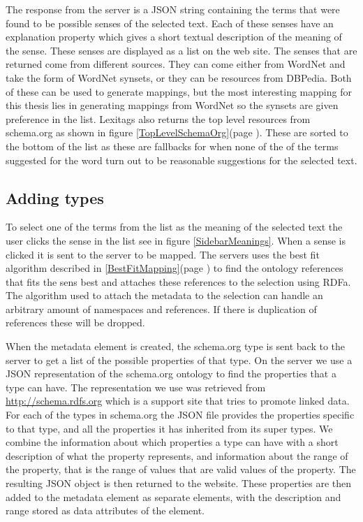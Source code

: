 The response from the server is a JSON string containing the terms that were found to be possible senses of the selected text.
Each of these senses have an explanation property which gives a short textual description of the meaning of the sense.
These senses are displayed as a list on the web site.
The senses that are returned come from different sources.
They can come either from WordNet and take the form of WordNet synsets, or they can be resources from DBPedia.
Both of these can be used to generate mappings,
but the most interesting mapping for this thesis lies in generating mappings from WordNet so the synsets are given preference in the list.
Lexitags also returns the top level resources from schema.org as shown in figure \ref{TopLevelSchemaOrg}(page \pageref{TopLevelSchemaOrg}).
These are sorted to the bottom of the list as these are fallbacks for when none of the of the terms suggested for
the word turn out to be reasonable suggestions for the selected text.

\subsection{Adding types}

To select one of the terms from the list as the meaning of the selected text the user clicks the sense in the list see in
figure \ref{SidebarMeanings}.
When a sense is clicked it is sent to the server to be mapped.
The servers uses the best fit algorithm described in \ref{BestFitMapping}(page \pageref{BestFitMapping}) to find the ontology references
that fits the sens best and attaches these references to the selection using RDFa.
The algorithm used to attach the metadata to the selection can handle an arbitrary amount of namespaces and references.
If there is duplication of references these will be dropped.

When the metadata element is created,
the schema.org type is sent back to the server to get a list of the possible properties of that type.
On the server we use a JSON representation of the schema.org ontology to find the properties that a type can have.
The representation we use was retrieved from \url{http://schema.rdfs.org} which is a support site that tries to
promote linked data.
For each of the types in schema.org the JSON file provides the properties specific to that type,
and all the properties it has inherited from its super types.
We combine the information about which properties a type can have with a short description of what the property represents,
and information about the range of the property, that is the range of values that are valid values of the property.
The resulting JSON object is then returned to the website.
These properties are then added to the metadata element as separate elements,
with the description and range stored as data attributes of the element.

